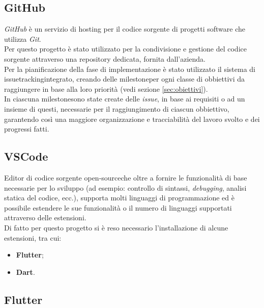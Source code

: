 \subsection*{GitHub}
\label{subsec:github}

\emph{GitHub}\cite{site:github} è un servizio di hosting per il codice sorgente di progetti software che utilizza \emph{Git}.\\
Per questo progetto è stato utilizzato per la condivisione e gestione del codice sorgente attraverso una repository dedicata, fornita dall'azienda.\\
Per la pianificazione della fase di implementazione è stato utilizzato il sistema di \gls{issuetracking}\glsoccur integrato, creando delle \gls{milestone}\glsoccur per ogni classe di obbiettivi da raggiungere in base alla loro priorità (vedi sezione \ref{sec:obiettivi}).\\
In ciascuna \gls{milestone}\glsoccur sono state create delle \emph{issue}, in base ai requisiti o ad un insieme di questi, necessarie per il raggiungimento di ciascun obbiettivo, garantendo così una maggiore organizzazione e tracciabilità del lavoro svolto e dei progressi fatti.

\subsection*{VSCode}
\label{subsec:vscode}

Editor di codice sorgente \gls{open-source}\glsoccur che oltre a fornire le funzionalità di base necessarie per lo sviluppo (ad esempio: controllo di sintassi, \emph{debugging}, analisi statica del codice, ecc.), supporta molti linguaggi di programmazione ed è possibile estendere le sue funzionalità o il numero di linguaggi supportati attraverso delle estensioni.\\
Di fatto per questo progetto si è reso necessario l'installazione di alcune estensioni, tra cui:
\begin{itemize}
    \item \textbf{Flutter}\cite{site:flutter-extension};
    \item \textbf{Dart}\cite{site:dart-extension}.
\end{itemize}

\subsection*{Flutter}
\label{subsec:flutter}


